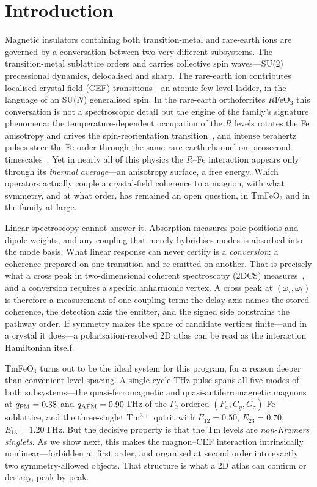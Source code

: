 \documentclass[aps,prb,twocolumn,superscriptaddress,longbibliography]{revtex4-2}
\newcommand{\qafm}{q_{\rm AFM}}
\newcommand{\qfm}{q_{\rm FM}}
\begin{document}
\section{Introduction}

Magnetic insulators containing both transition-metal and rare-earth
ions are governed by a conversation between two very different
subsystems.  The transition-metal sublattice orders and carries
collective spin waves---SU(2) precessional dynamics, delocalised and
sharp.  The rare-earth ion contributes localised crystal-field (CEF)
transitions---an atomic few-level ladder, in the language of an
SU($N$) generalised spin.  In the rare-earth orthoferrites
$R$FeO$_3$ this conversation is not a spectroscopic detail but the
engine of the family's signature phenomena: the temperature-dependent
occupation of the $R$ levels rotates the Fe anisotropy and drives the
spin-reorientation transition~\cite{Yamaguchi,Kimel2004,Zhang2016},
and intense terahertz pulses steer the Fe order through the same
rare-earth channel on picosecond
timescales~\cite{Baierl2016,Schlauderer2019}.  Yet in nearly all of
this physics the $R$--Fe interaction appears only through its
\emph{thermal average}---an anisotropy surface, a free energy.  Which
operators actually couple a crystal-field coherence to a magnon, with
what symmetry, and at what order, has remained an open question, in
TmFeO$_3$ and in the family at large.

Linear spectroscopy cannot answer it.  Absorption measures pole
positions and dipole weights, and any coupling that merely hybridises
modes is absorbed into the mode basis.  What linear response can
never certify is a \emph{conversion}: a coherence prepared on one
transition and re-emitted on another.  That is precisely what a cross
peak in two-dimensional coherent spectroscopy (2DCS)
measures~\cite{Lu2017,Mukamel}, and a conversion requires a specific
anharmonic vertex.  A cross peak at $(\omega_\tau,\omega_t)$ is
therefore a measurement of one coupling term: the delay axis names
the stored coherence, the detection axis the emitter, and the signed
side constrains the pathway order.  If symmetry makes the space of
candidate vertices finite---and in a crystal it does---a
polarisation-resolved 2D atlas can be read as the interaction
Hamiltonian itself.

TmFeO$_3$ turns out to be the ideal system for this program, for a
reason deeper than convenient level spacing.  A single-cycle THz
pulse spans all five modes of both subsystems---the
quasi-ferromagnetic and quasi-antiferromagnetic magnons at
$\qfm=0.38$ and $\qafm=0.90$\,THz of the $\Gamma_2$-ordered
$(F_x,C_y,G_z)$ Fe sublattice, and the three-singlet Tm$^{3+}$ qutrit
with $E_{12}=0.50$, $E_{23}=0.70$, $E_{13}=1.20$\,THz.  But the
decisive property is that the Tm levels are \emph{non-Kramers
singlets}.  As we show next, this makes the magnon--CEF interaction
intrinsically nonlinear---forbidden at first order, and organised at
second order into exactly two symmetry-allowed objects.  That
structure is what a 2D atlas can confirm or destroy, peak by peak.
\end{document}
